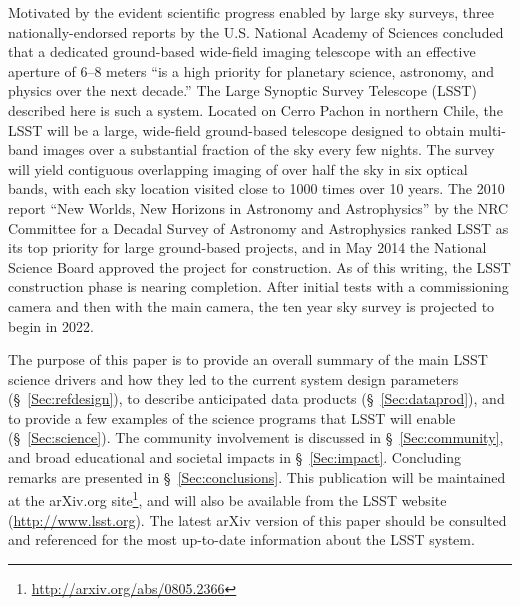 Motivated by the evident scientific progress enabled by large sky surveys,
three nationally-endorsed reports by the U.S. National Academy of Sciences
\citep{NAP9839,NAP10079,NAP10432}
concluded that a dedicated ground-based wide-field imaging telescope with an effective aperture
of 6--8 meters ``is a high priority for planetary science, astronomy, and physics
over the next decade.'' The Large Synoptic Survey Telescope (LSST) described here is
such a system. Located on Cerro Pachon in northern Chile,
the LSST will be a large, wide-field ground-based telescope
designed to obtain multi-band images over a substantial fraction of the sky
every few nights. The survey will yield contiguous overlapping imaging of over
half the sky in six optical bands, with each sky location visited close to 1000 times over
10 years. The 2010 report ``New Worlds, New Horizons in Astronomy and Astrophysics''
by the NRC Committee for a Decadal Survey of Astronomy and
Astrophysics \citep{NAP12951}
ranked LSST as its top priority for large ground-based projects, and in May 2014 the National
Science Board approved the project for construction.
As of this writing, the LSST construction phase is nearing completion.
After initial tests with a commissioning camera and then with the main camera, the
ten year sky survey is projected to begin in 2022.

The purpose of this paper is to provide an overall summary of the main LSST
science drivers and how they led to the current system design parameters
(\S~\ref{Sec:refdesign}), to describe anticipated data products (\S~\ref{Sec:dataprod}),
and to provide a few examples of the science programs that LSST will enable
(\S~\ref{Sec:science}). The community involvement is discussed in \S~\ref{Sec:community},
and broad educational and societal impacts in \S~\ref{Sec:impact}. Concluding
remarks are presented in \S~\ref{Sec:conclusions}. This publication will be maintained
at the arXiv.org site\footnote{\url{http://arxiv.org/abs/0805.2366}}, and will also
be available from the LSST website (\url{http://www.lsst.org}). The latest arXiv version of this paper
should be consulted and referenced for the most up-to-date information about the
LSST system.

